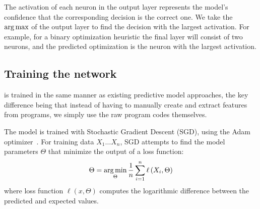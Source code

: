 The activation of each neuron in the output layer represents the model's confidence that the corresponding decision is the correct one. We take the $\operatorname*{arg\,max}$ of the output layer to find the decision with the largest activation. For example, for a binary optimization heuristic the final layer will consist of two neurons, and the predicted optimization is the neuron with the largest activation.


\subsection{Training the network}

\DeepTune is trained in the same manner as existing predictive model approaches, the key difference being that instead of having to manually create and extract features from programs, we simply use the raw program codes themselves.

The model is trained with Stochastic Gradient Descent (SGD), using the Adam optimizer~\cite{Kingma2015}. For training data $X_1 \ldots X_n$, SGD attempts to find the model parameters $\Theta$ that minimize the output of a loss function:
%
\[ \Theta = \operatorname*{arg\,min}_{\Theta} \frac{1}{n} \sum_{i=1}^{n} \ell \left(X_i, \Theta \right) \]
%
where loss function $\ell \left(x, \Theta \right)$ computes the logarithmic difference between the predicted and expected values.
